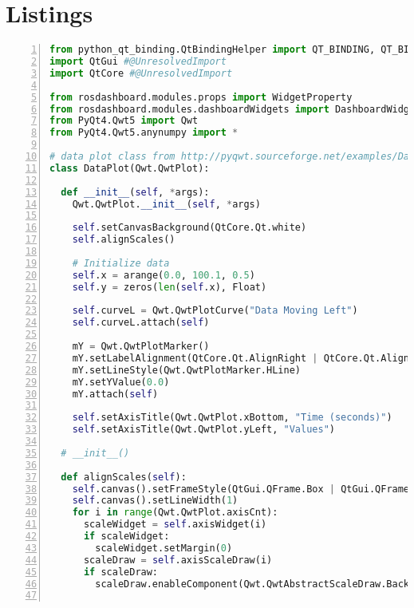 



\pagebreak


\pagestyle{myheadings}

\chapter*{Listings}


\begin{lstlisting}[frame=single,caption={DragPlot implementation.},label=drag_plot_implementation,language=Python,numbers=left,breaklines=true]
from python_qt_binding.QtBindingHelper import QT_BINDING, QT_BINDING_VERSION #@UnresolvedImport @UnusedImport
import QtGui #@UnresolvedImport
import QtCore #@UnresolvedImport

from rosdashboard.modules.props import WidgetProperty
from rosdashboard.modules.dashboardWidgets import DashboardWidget
from PyQt4.Qwt5 import Qwt
from PyQt4.Qwt5.anynumpy import *

# data plot class from http://pyqwt.sourceforge.net/examples/DataDemo.py.html
class DataPlot(Qwt.QwtPlot):

  def __init__(self, *args):
    Qwt.QwtPlot.__init__(self, *args)

    self.setCanvasBackground(QtCore.Qt.white)
    self.alignScales()

    # Initialize data
    self.x = arange(0.0, 100.1, 0.5)
    self.y = zeros(len(self.x), Float)

    self.curveL = Qwt.QwtPlotCurve("Data Moving Left")
    self.curveL.attach(self)

    mY = Qwt.QwtPlotMarker()
    mY.setLabelAlignment(QtCore.Qt.AlignRight | QtCore.Qt.AlignTop)
    mY.setLineStyle(Qwt.QwtPlotMarker.HLine)
    mY.setYValue(0.0)
    mY.attach(self)

    self.setAxisTitle(Qwt.QwtPlot.xBottom, "Time (seconds)")
    self.setAxisTitle(Qwt.QwtPlot.yLeft, "Values")

  # __init__()

  def alignScales(self):
    self.canvas().setFrameStyle(QtGui.QFrame.Box | QtGui.QFrame.Plain)
    self.canvas().setLineWidth(1)
    for i in range(Qwt.QwtPlot.axisCnt):
      scaleWidget = self.axisWidget(i)
      if scaleWidget:
        scaleWidget.setMargin(0)
      scaleDraw = self.axisScaleDraw(i)
      if scaleDraw:
        scaleDraw.enableComponent(Qwt.QwtAbstractScaleDraw.Backbone, False)


\end{lstlisting}
